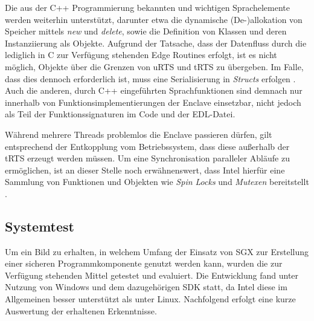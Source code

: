 Die aus der C++ Programmierung bekannten und wichtigen Sprachelemente werden weiterhin unterstützt, darunter etwa die dynamische (De-)allokation von Speicher mittels \textit{new} und \textit{delete}, sowie die Definition von Klassen und deren Instanziierung als Objekte. Aufgrund der Tatsache, dass der Datenfluss durch die lediglich in C zur Verfügung stehenden Edge Routines erfolgt, ist es nicht möglich, Objekte über die Grenzen von \ac{uRTS} und \ac{tRTS} zu übergeben. Im Falle, dass dies dennoch erforderlich ist, muss eine Serialisierung in \textit{Structs} erfolgen \cite{LinuxGuide}. Auch die anderen, durch C++ eingeführten Sprachfunktionen sind demnach nur innerhalb von Funktionsimplementierungen der Enclave einsetzbar, nicht jedoch als Teil der Funktionssignaturen im Code und der \ac{EDL}-Datei.

Während mehrere Threads problemlos die Enclave passieren dürfen, gilt entsprechend der Entkopplung vom Betriebssystem, dass diese außerhalb der \ac{tRTS} erzeugt werden müssen. Um eine Synchronisation paralleler Abläufe zu ermöglichen, ist an dieser Stelle noch erwähnenswert, dass Intel hierfür eine Sammlung von Funktionen und Objekten wie \textit{Spin Locks} und \textit{Mutexen} bereitstellt \cite{LinuxGuide}.

\subsection{Systemtest}

Um ein Bild zu erhalten, in welchem Umfang der Einsatz von \ac{SGX} zur Erstellung einer sicheren Programmkomponente genutzt werden kann, wurden die zur Verfügung stehenden Mittel getestet und evaluiert. Die Entwicklung fand unter Nutzung von Windows und dem dazugehörigen \ac{SDK} statt, da Intel diese im Allgemeinen besser unterstützt als unter Linux. Nachfolgend erfolgt eine kurze Auswertung der erhaltenen Erkenntnisse.

